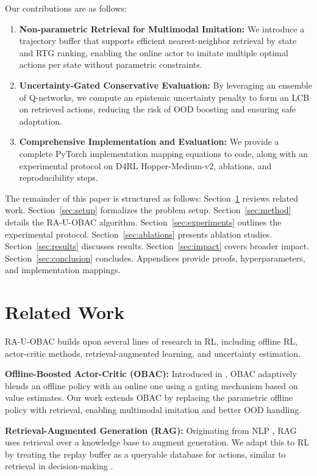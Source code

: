 \documentclass{article}
\begin{document}
Our contributions are as follows:
\begin{enumerate}
  \item \textbf{Non-parametric Retrieval for Multimodal Imitation:} We introduce a trajectory buffer that supports efficient nearest-neighbor retrieval by state and RTG ranking, enabling the online actor to imitate multiple optimal actions per state without parametric constraints.
  \item \textbf{Uncertainty-Gated Conservative Evaluation:} By leveraging an ensemble of Q-networks, we compute an epistemic uncertainty penalty to form an LCB on retrieved actions, reducing the risk of OOD boosting and ensuring safe adaptation.
  \item \textbf{Comprehensive Implementation and Evaluation:} We provide a complete PyTorch implementation mapping equations to code, along with an experimental protocol on D4RL Hopper-Medium-v2, ablations, and reproducibility steps.
\end{enumerate}

The remainder of this paper is structured as follows: Section~\ref{sec:related} reviews related work. Section~\ref{sec:setup} formalizes the problem setup. Section~\ref{sec:method} details the RA-U-OBAC algorithm. Section~\ref{sec:experiments} outlines the experimental protocol. Section~\ref{sec:ablations} presents ablation studies. Section~\ref{sec:results} discusses results. Section~\ref{sec:impact} covers broader impact. Section~\ref{sec:conclusion} concludes. Appendices provide proofs, hyperparameters, and implementation mappings.

\section{Related Work}
\label{sec:related}

RA-U-OBAC builds upon several lines of research in RL, including offline RL, actor-critic methods, retrieval-augmented learning, and uncertainty estimation.

\textbf{Offline-Boosted Actor-Critic (OBAC):} Introduced in \cite{obac2024}, OBAC adaptively blends an offline policy with an online one using a gating mechanism based on value estimates. Our work extends OBAC by replacing the parametric offline policy with retrieval, enabling multimodal imitation and better OOD handling.

\textbf{Retrieval-Augmented Generation (RAG):} Originating from NLP \cite{rag2020}, RAG uses retrieval over a knowledge base to augment generation. We adapt this to RL by treating the replay buffer as a queryable database for actions, similar to retrieval in decision-making \cite{schrittwieser2020mastering}.
\end{document}
